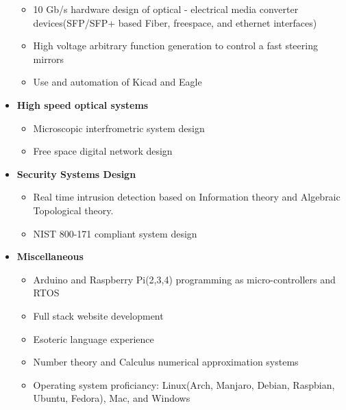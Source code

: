 \documentclass[10pt]{extarticle}
\theoremstyle{plain}
\theoremstyle{Definition}
\theoremstyle{Definition}
\theoremstyle{plain}
\begin{document}
\begin{itemize}
			\begin{itemize}
				\item 10 Gb/s hardware design of optical - electrical media converter devices(SFP/SFP+ based Fiber, freespace, and ethernet interfaces)
				\item High voltage arbitrary function generation to control a fast steering mirrors
				\item Use and automation of Kicad and Eagle
			\end{itemize}			
			\item \textbf{High speed optical systems }
			\begin{itemize}
				\item Microscopic interfrometric system design
				\item Free space digital network design
			\end{itemize}
			\item \textbf{Security Systems Design}
			\begin{itemize}
				\item Real time intrusion detection based on Information theory and Algebraic Topological theory. 
				\item NIST 800-171 compliant system design
			\end{itemize}
			\item \textbf{Miscellaneous}
			\begin{itemize}
				\item Arduino and Raspberry Pi(2,3,4) programming as micro-controllers and RTOS
				\item Full stack website development
				\item Esoteric language experience
				\item Number theory and Calculus numerical approximation systems
				\item Operating system proficiancy: Linux(Arch, Manjaro, Debian, Raspbian, Ubuntu, Fedora), Mac, and Windows
			\end{itemize}	
		\end{itemize}
\end{document}
